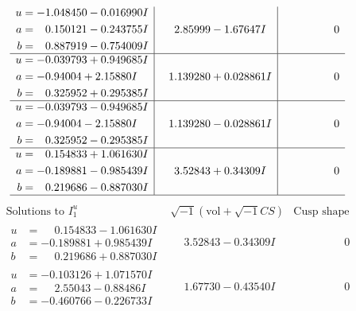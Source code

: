 \documentclass[1p]{elsarticle_modified}
\theoremstyle{definition}
\newcommand{\I}{\sqrt{-1}}
\begin{document}
$$\begin{array}{c|c|c}
\begin{aligned}
u &= -1.048450 - 0.016990 I \\
a &= \phantom{-}0.150121 - 0.243755 I \\
b &= \phantom{-}0.887919 - 0.754009 I\end{aligned}
 & \phantom{-}2.85999 - 1.67647 I & \phantom{-0.000000 } 0 \\ \hline\begin{aligned}
u &= -0.039793 + 0.949685 I \\
a &= -0.94004 + 2.15880 I \\
b &= \phantom{-}0.325952 + 0.295385 I\end{aligned}
 & \phantom{-}1.139280 + 0.028861 I & \phantom{-0.000000 } 0 \\ \hline\begin{aligned}
u &= -0.039793 - 0.949685 I \\
a &= -0.94004 - 2.15880 I \\
b &= \phantom{-}0.325952 - 0.295385 I\end{aligned}
 & \phantom{-}1.139280 - 0.028861 I & \phantom{-0.000000 } 0 \\ \hline\begin{aligned}
u &= \phantom{-}0.154833 + 1.061630 I \\
a &= -0.189881 - 0.985439 I \\
b &= \phantom{-}0.219686 - 0.887030 I\end{aligned}
 & \phantom{-}3.52843 + 0.34309 I & \phantom{-0.000000 } 0\\
 \hline 
 \end{array}$$\newpage$$\begin{array}{c|c|c}  
\text{Solutions to }I^u_{1}& \I (\text{vol} + \sqrt{-1}CS) & \text{Cusp shape}\\
 \hline 
\begin{aligned}
u &= \phantom{-}0.154833 - 1.061630 I \\
a &= -0.189881 + 0.985439 I \\
b &= \phantom{-}0.219686 + 0.887030 I\end{aligned}
 & \phantom{-}3.52843 - 0.34309 I & \phantom{-0.000000 } 0 \\ \hline\begin{aligned}
u &= -0.103126 + 1.071570 I \\
a &= \phantom{-}2.55043 - 0.88486 I \\
b &= -0.460766 - 0.226733 I\end{aligned}
 & \phantom{-}1.67730 - 0.43540 I & \phantom{-0.000000 } 0 \\ \hline\begin{aligned}

\end{aligned}
\end{array}$$
\end{document}
